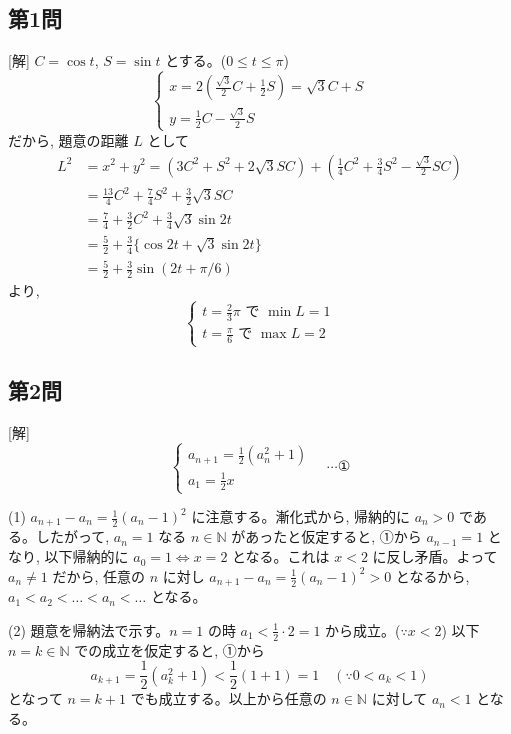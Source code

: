\documentclass[../main.tex]{subfiles}
\begin{document}
\subsection*{第1問}

[解] $C = \cos t$, $S = \sin t$ とする。($0 \le t \le \pi$)
\[
  \begin{cases}
    x = 2\left(\frac{\sqrt{3}}{2} C + \frac{1}{2} S\right) = \sqrt{3} C + S \\
    y = \frac{1}{2} C - \frac{\sqrt{3}}{2} S
  \end{cases}
\]
だから, 題意の距離 $L$ として
\[
  \begin{aligned}
    L^2 &= x^2 + y^2 = \left( 3C^2 + S^2 + 2\sqrt{3}SC \right) + \left( \frac{1}{4}C^2 + \frac{3}{4}S^2 - \frac{\sqrt{3}}{2}SC \right) \\
    &= \frac{13}{4} C^2 + \frac{7}{4} S^2 + \frac{3}{2}\sqrt{3} SC \\
    &= \frac{7}{4} + \frac{3}{2} C^2 + \frac{3}{4}\sqrt{3} \sin 2t \\
    &= \frac{5}{2} + \frac{3}{4} \{ \cos 2t + \sqrt{3} \sin 2t \} \\
    &= \frac{5}{2} + \frac{3}{2} \sin(2t + \pi/6)
  \end{aligned}
\]
より,
\[
  \begin{cases}
    t = \frac{2}{3}\pi \text{ で } \min L = 1 \\
    t = \frac{\pi}{6} \text{ で } \max L = 2
  \end{cases}
\]

\subsection*{第2問}

[解]
\[
  \begin{cases}
    a_{n+1} = \frac{1}{2}(a_n^2 + 1) \\
    a_1 = \frac{1}{2}x
  \end{cases}
  \quad \cdots \text{①}
\]

(1) $a_{n+1} - a_n = \frac{1}{2}(a_n - 1)^2$ に注意する。漸化式から, 帰納的に $a_n > 0$ である。したがって, $a_n = 1$ なる $n \in \mathbb{N}$ があったと仮定すると, ①から $a_{n-1} = 1$ となり, 以下帰納的に $a_0 = 1 \iff x = 2$ となる。これは $x < 2$ に反し矛盾。よって $a_n \neq 1$ だから, 任意の $n$ に対し $a_{n+1} - a_n = \frac{1}{2}(a_n - 1)^2 > 0$ となるから, $a_1 < a_2 < \dots < a_n < \dots$ となる。 \quad [終]

(2) 題意を帰納法で示す。$n=1$ の時 $a_1 < \frac{1}{2} \cdot 2 = 1$ から成立。($\because x < 2$)
以下 $n=k \in \mathbb{N}$ での成立を仮定すると, ①から
\[
  a_{k+1} = \frac{1}{2}(a_k^2 + 1) < \frac{1}{2}(1 + 1) = 1 \quad (\because 0 < a_k < 1)
\]
となって $n=k+1$ でも成立する。以上から任意の $n \in \mathbb{N}$ に対して $a_n < 1$ となる。 \quad [終]
\end{document}
